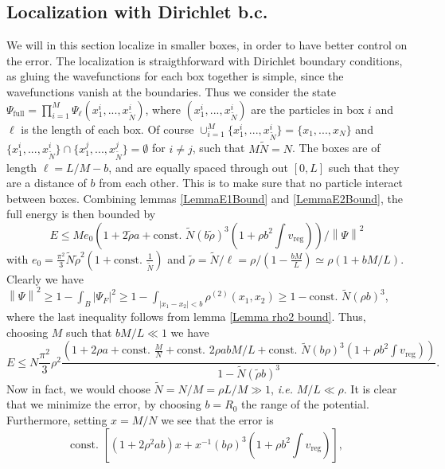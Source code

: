 \documentclass[a4paper,11pt]{article}
\newcommand{\norm}[1]{\left\lVert #1 \right\rVert}
\newcommand{\abs}[1]{\left\lvert #1 \right\rvert}
\newcommand{\ie}{\emph{i.e.} }
\numberwithin{equation}{section}
\begin{document}
	\subsection{Localization with Dirichlet b.c.}
	We will in this section localize in smaller boxes, in order to have better control on the error. The localization is straigthforward with Dirichlet boundary conditions, as gluing the wavefunctions for each box together is simple, since the wavefunctions vanish at the boundaries. Thus we consider the state $ \Psi_{\text{full}}=\prod_{i=1}^{M}\Psi_{\ell}(x^i_1,...,x^i_{\tilde{N}}) $, where $ (x_1^i,...,x_{\tilde{N}}^i) $ are the particles in box $ i $ and $ \ell $ is the length of each box. Of course $ \cup_{i=1}^{M}\{x_1^i,...,x_{\tilde{N}}^i\}=\{x_1,...,x_N\} $ and $ \{x_1^i,...,x_{\tilde{N}}^i\}\cap\{x_1^j,...,x_{\tilde{N}}^j\}=\emptyset $ for $ i\neq j $, such that $ M\tilde{N}=N $. The boxes are of length $ \ell=L/M-b $, and are equally spaced through out $ [0,L] $ such that they are a distance of $ b $ from each other. This is to make sure that no particle interact between boxes. Combining lemmas \ref{LemmaE1Bound} and \ref{LemmaE2Bound}, the full energy is then bounded by \begin{equation}
	E\leq M e_0\left(1+2\tilde{\rho} a + \text{const. } \tilde{N} (b\tilde{\rho})^3\left(1+\rho b^2\int v_{\text{reg}}\right)\right)/\norm{\Psi}^2
	\end{equation}
	with $ e_0=\frac{\pi^2}{3}\tilde{N}\tilde{\rho}^2(1+\text{const. }\frac{1}{\tilde{N}}) $ and $ \tilde{\rho}=\tilde{N}/\ell=\rho/(1-\frac{bM}{L})\simeq\rho(1+bM/L) $. Clearly we have $ \norm{\Psi}^2\geq 1-\int_B\abs{\Psi_F}^2\geq 1-\int_{\abs{x_1-x_2}<b}\rho^{(2)}(x_1,x_2)\geq 1-\text{const. }\tilde{N}(\rho b)^3 $, where the last inequality follows from lemma \ref{Lemma rho2 bound}.
	Thus, choosing $ M $ such that $ bM/L\ll 1 $ we have \begin{equation}
	E\leq N\frac{\pi^2}{3}\rho^2\frac{\left(1+2\rho a+\text{const. }\frac{M}{N}+\text{const. }2\rho abM/L+\text{const. }\tilde{N}(b\rho)^3\left(1+\rho b^2\int v_{\text{reg}}\right)\right)}{1-\tilde{N}(\tilde{\rho} b)^3}.
	\end{equation}
	Now in fact, we would choose $ \tilde{N}=N/M=\rho L/M\gg 1 $, \ie $ M/L\ll \rho $. It is clear that we minimize the error, by choosing $ b=R_0 $ the range of the potential. Furthermore, setting $ x=M/N $ we see that the error is \begin{equation}
	\text{const. }\left[(1+2\rho^2 ab)x+x^{-1}(b\rho)^3\left(1+\rho b^2\int v_{\text{reg}}\right)\right],
	\end{equation}
\end{document}
